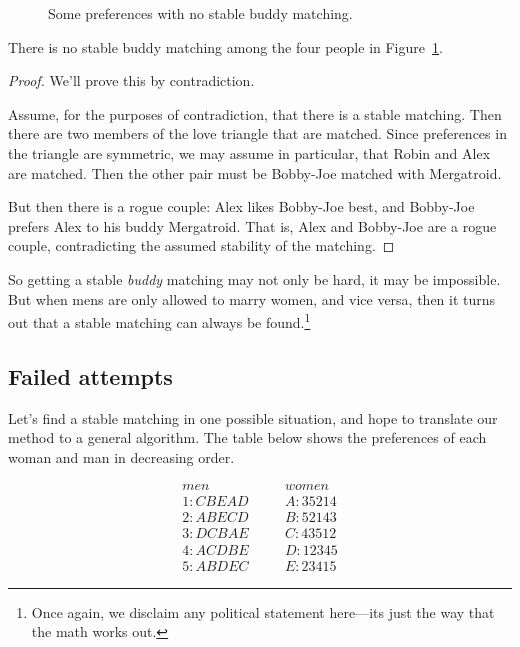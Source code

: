 \begin{figure}[htbp]


\caption{Some preferences with no stable buddy matching.}
\label{fig:buddy}
\end{figure}

\begin{lemma}\label{lem:nostablematch}
There is no stable buddy matching among the four people in
Figure~\ref{fig:buddy}.
\end{lemma}

\begin{proof}
We'll prove this by contradiction.

Assume, for the purposes of contradiction, that there is a stable
matching.  Then there are two members of the love triangle that are
matched.  Since preferences in the triangle are symmetric, we may assume
in particular, that Robin and Alex are matched.  Then the other pair must
be Bobby-Joe matched with Mergatroid.

But then there is a rogue couple: Alex likes Bobby-Joe best, and Bobby-Joe
prefers Alex to his buddy Mergatroid.  That is, Alex and Bobby-Joe are a
rogue couple, contradicting the assumed stability of the matching.
\end{proof}

So getting a stable \emph{buddy} matching may not only be hard, it may
be impossible.  But when mens are only allowed to marry women, and
vice versa, then it turns out that a stable matching can always be
found.\footnote{Once again, we disclaim any political statement
  here---its just the way that the math works out.}


\iffalse

\subsection{Failed attempts}

Let's find a stable matching in one possible situation, and hope to
translate our method to a general algorithm.  The table below shows the
preferences of each woman and man in decreasing order.

\begin{eqnarray*}
men & \quad & women \\
1 : C B E A D & \quad & A : 3 5 2 1 4 \\
2 : A B E C D & \quad & B : 5 2 1 4 3 \\
3 : D C B A E & \quad & C : 4 3 5 1 2 \\
4 : A C D B E & \quad & D : 1 2 3 4 5 \\
5 : A B D E C & \quad & E : 2 3 4 1 5
\end{eqnarray*}

